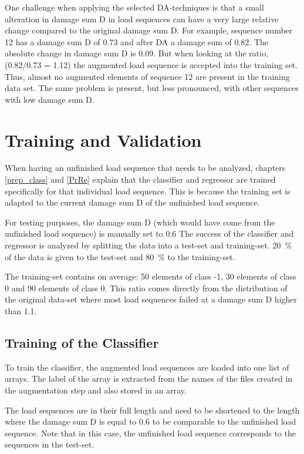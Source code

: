 One challenge when applying the selected DA-techniques is that a small alteration in damage sum D in load sequences can have a very large relative change compared to the original damage sum D. For example, sequence number 12 has a damage sum D of 0.73 and after DA a damage sum of 0.82. The absolute change in damage sum D is 0.09. But when looking at the ratio, (0.82/0.73 = 1.12) the augmented load sequence is accepted into the training set. Thus, almost no augmented elements of sequence 12 are present in the training data set. The same problem is present, but less pronounced, with other sequences with low damage sum D.



\section{Training and Validation}
When having an unfinished load sequence that needs to be analyzed, chapters \ref{prep_class} and \ref{PrRe} explain that the classifier and regressor are trained specifically for that individual load sequence. This is because the training set is adapted to the current damage sum D of the unfinished load sequence.

For testing purposes, the damage sum D (which would have come from the unfinished load sequence) is manually set to 0.6
The success of the classifier and regressor is analyzed by splitting the data into a test-set and training-set. 
20~\% of the data is given to the test-set and 80~\% to the training-set.

The training-set contains on average: 50 elements of class -1, 30 elements of class 0 and 90 elements of class 0. This ratio comes directly from the distribution of the original data-set where most load sequences failed at a damage sum D higher than 1.1.

\subsection{Training of the Classifier}
To train the classifier, the augmented load sequences are loaded into one list of arrays. The label of the array is extracted from the names of the files created in the augmentation step and also stored in an array. 

The load sequences are in their full length and need to be shortened to the length where the damage sum D is equal to 0.6 to be comparable to the unfinished load sequence. Note that in this case, the unfinished load sequence corresponds to the sequences in the test-set. 


